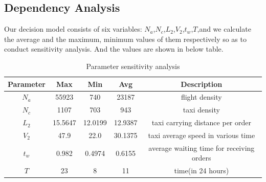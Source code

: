 \subsection{Dependency Analysis}
Our decision model consists of six variables: $N_a$,$N_c$,$L_2$,$V_2$,$t_w$,$T$,and we calculate the average and the maximum, minimum values of them respectively so as to conduct sensitivity analysis. And the values are shown in below table.
\begin{table}[H]
\centering
\caption{Parameter sensitivity analysis}
\begin{tabularx}{15cm}{c|c|c|c|c} 
\hline                    
Parameter & Max & Min & Avg & Description\\
\hline
$N_a$  & 55923 & 740 & 23187 & flight density\\
$N_c$  & 1107 & 703 & 943 & taxi density \\
$L_2$  & 15.5647 & 12.0199 & 12.9387 & taxi carrying distance per order\\
$V_2$  & 47.9 & 22.0 & 30.1375 & taxi average speed in various time\\
$t_w$  & 0.982 & 0.4974 & 0.6155 & average waiting time for receiving orders \\
$T$  & 23 & 8 & 11 & time(in 24 hours)\\
\hline
\end{tabularx}
\end{table}

